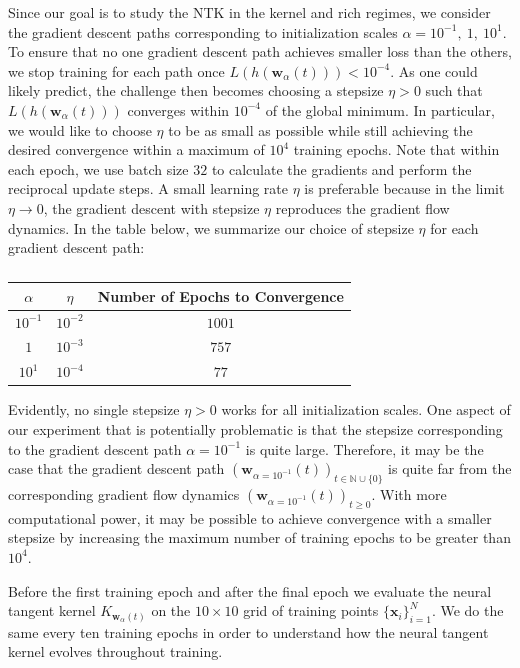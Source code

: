 \documentclass{article}
\begin{document}
Since our goal is to study the NTK in the kernel and rich regimes, we consider the gradient descent paths corresponding to initialization scales $\alpha = 10^{-1}, \ 1, \ 10^{1}$. To ensure that no one gradient descent path achieves smaller loss than the others, we stop training for each path once $L(h(\boldsymbol{w}_{\alpha}(t))) < 10^{-4}$. As one could likely predict, the challenge then becomes choosing a stepsize $\eta > 0$ such that $L(h(\boldsymbol{w}_{\alpha}(t)))$ converges within $10^{-4}$ of the global minimum. In particular, we would like to choose $\eta$ to be as small as possible while still achieving the desired convergence within a maximum of $10^4$ training epochs. Note that within each epoch, we use batch size $32$ to calculate the gradients and perform the reciprocal update steps. A small learning rate $\eta$ is preferable because in the limit $\eta \rightarrow 0$, the gradient descent with stepsize $\eta$ reproduces the gradient flow dynamics. In the table below, we summarize our choice of stepsize $\eta$ for each gradient descent path:
\begin{table}[H]
\centering
\begin{tabular}{ c|c|c } 
$\alpha$ & $\eta$ & Number of Epochs to Convergence \\
\hline
$10^{-1}$ & $10^{-2}$ & $1001$ \\ 
$1$ & $10^{-3}$ & $757$ \\
$10^1$ & $10^{-4}$ & $77$
\end{tabular}
\caption{}\label{table:NTK}
\end{table}

Evidently, no single stepsize $\eta > 0$ works for all initialization scales. One aspect of our experiment that is potentially problematic is that the stepsize corresponding to the gradient descent path $\alpha = 10^{-1}$ is quite large. Therefore, it may be the case that the gradient descent path $(\boldsymbol{w}_{\alpha = 10^{-1}}(t))_{t \in \mathbb{N} \cup \{ 0 \}}$ is quite far from the corresponding gradient flow dynamics $(\boldsymbol{w}_{\alpha = 10^{-1}}(t))_{t\geq 0}$. With more computational power, it may be possible to achieve convergence with a smaller stepsize by increasing the maximum number of training epochs to be greater than $10^4$.

Before the first training epoch and after the final epoch we evaluate the neural tangent kernel $K_{\boldsymbol{w}_{\alpha}(t)}$ on the $10 \times 10$ grid of training points $\{ \boldsymbol{x}_i \}_{i=1}^N$. We do the same every ten training epochs in order to understand how the neural tangent kernel evolves throughout training.
\end{document}
